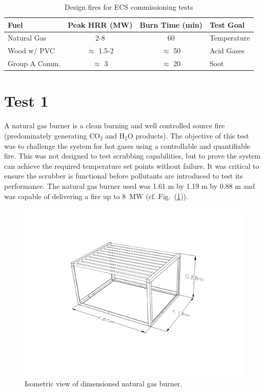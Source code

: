 \documentclass[12pt,oneside]{book}
\begin{document}
\begin{table}[!h]
\centering
\caption{Design fires for ECS commissioning tests}
\label{tab:fires}
\begin{tabular}{lccl}
\toprule[1.5pt]
Fuel & Peak HRR (MW) & Burn Time (min) & Test Goal  \\
\midrule
Natural Gas   & 2-8             & 60            & Temperature  \\
Wood w/ PVC   & $\approx$ 1.5-2 & $\approx$ 50  & Acid Gases \\
Group A Comm. & $\approx$ 3     & $\approx$ 20  & Soot \\
\bottomrule[1.25pt]
\end{tabular}\par
\end{table}


\section{Test 1}
\label{test1}
A natural gas burner is a clean burning and well controlled source fire (predominately generating CO$_2$ and H$_2$O products). The objective of this test was to challenge the system for hot gases using a controllable and quantifiable fire. This was not designed to test scrubbing capabilities, but to prove the system can achieve the required temperature set points without failure. It was critical to ensure the scrubber is functional before pollutants are introduced to test its performance. The natural gas burner used was 1.61 m by 1.19 m by 0.88 m and was capable of delivering a fire up to 8~MW (cf. Fig.~(\ref{fig:nat_gas_burn})).

\begin{figure}
\centering
\includegraphics[width=.8\textwidth]{../Figures/Natural_Gas_Burner}
\caption {Isometric view of dimensioned natural gas burner.}
\label{fig:nat_gas_burn}
\end{figure}
\end{document}
